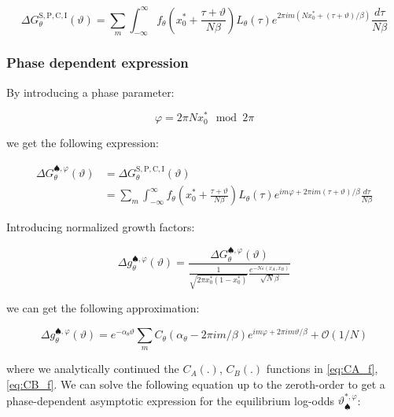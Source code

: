 \documentclass{article}
\theoremstyle{definition}
\begin{document}
\begin{equation}
    \Delta G_\theta^\mathrm{S,P,C,I}(\vartheta) = \sum_m \int_{-\infty}^\infty 
    f_\theta \left ( x_0^* + \frac{\tau + \vartheta}{N \beta} \right ) L_\theta(\tau)
    e^{2 \pi i m \left ( N x_0^* + (\tau + \vartheta)/\beta \right )}
    \frac{d\tau}{N \beta}
\end{equation}

\subsubsection{Phase dependent expression}

By introducing a phase parameter:

\begin{equation}
    \varphi = 2 \pi N x_0^* \mod 2 \pi
\end{equation}

we get the following expression:

\begin{equation}
    \begin{split}
        \Delta G_\theta^{\spadesuit,\varphi}(\vartheta) &= \Delta G_\theta^\mathrm{S,P,C,I}(\vartheta) \\
        &= 
        \sum_m \int_{-\infty}^\infty 
        f_\theta \left ( x_0^* + \frac{\tau + \vartheta}{N \beta} \right ) L_\theta(\tau)
        e^{i m \varphi + 2 \pi i m (\tau + \vartheta)/\beta}
        \frac{d\tau}{N \beta}
    \end{split}
\end{equation}

Introducing normalized growth factors:

\begin{equation}
    \Delta g_\theta^{\spadesuit,\varphi}(\vartheta) = 
    \frac{\Delta G_\theta^{\spadesuit,\varphi}(\vartheta)}{
    \frac{1}{\sqrt{2 \pi x_0^* (1-x_0^*)}} \frac{e^{- N \varepsilon(x_A,x_B)}}{\sqrt{N} \beta}
    }
\end{equation}

we can get the following approximation:

\begin{equation}
    \Delta g_\theta^{\spadesuit,\varphi}(\vartheta) = 
    e^{-\alpha_\theta \vartheta}
    \sum_m C_\theta(\alpha_\theta - 2 \pi i m/\beta) e^{i m \varphi + 2 \pi i m \vartheta / \beta }
    +\mathcal{O}(1/N)
\end{equation}

where we analytically continued the $C_A(.)$, $C_B(.)$ functions in \eqref{eq:CA_f}, \eqref{eq:CB_f}.
We can solve the following equation up to the zeroth-order to get a phase-dependent asymptotic expression for the equilibrium log-odds $\vartheta^{*,\varphi}_\spadesuit$:
\end{document}
